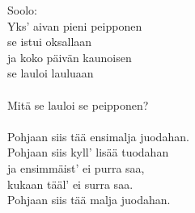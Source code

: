 
            Soolo: \\
            Yks' aivan pieni peipponen \\
            se istui oksallaan \\
            ja koko päivän kaunoisen \\
            se lauloi lauluaan \\
\hspace{10mm} \\
            Mitä se lauloi se peipponen? \\
\hspace{10mm} \\
            Pohjaan siis tää ensimalja juodahan. \\
            Pohjaan siis kyll’ lisää tuodahan \\
            ja ensimmäist’ ei purra saa, \\
            kukaan tääl' ei surra saa. \\
            Pohjaan siis tää malja juodahan. \\
